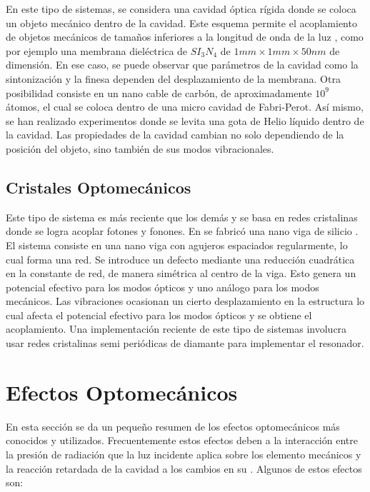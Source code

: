 \documentclass[10pt,a4paper]{report}
\begin{document}
En este tipo de sistemas, se considera una cavidad óptica rígida donde
se coloca un objeto mecánico dentro de la cavidad. Este esquema
permite el acoplamiento de objetos mecánicos de tamaños inferiores a
la longitud de onda de la luz \cite{KippenberCO}, como por ejemplo una
membrana dieléctrica de $SI_3N_4$ de $1mm \times 1mm \times 50nm$ de
dimensión\cite{SankeyMC}. En ese caso, se puede observar que
parámetros de la cavidad como la sintonización y la finesa dependen
del desplazamiento de la membrana. Otra posibilidad consiste en un
nano cable de carbón, de aproximadamente $10^9$ átomos, el cual se
coloca dentro de una micro cavidad de Fabri-Perot. Así mismo, se han
realizado experimentos donde se levita una gota de Helio líquido
dentro de la cavidad\cite{ChildressLD}. Las propiedades de la cavidad
cambian no solo dependiendo de la posición del objeto, sino también de
sus modos vibracionales\cite{FaveroCR}.

\subsection{Cristales Optomecánicos}

Este tipo de sistema es más reciente que los demás y se basa en redes
cristalinas donde se logra acoplar fotones y fonones. En
 se fabricó una nano viga
de silicio \cite{EichenfieldOC}. El sistema consiste en una nano viga
con agujeros espaciados regularmente, lo cual forma una red. Se
introduce un defecto mediante una reducción cuadrática en la constante
de red, de manera simétrica al centro de la viga. Esto genera un
potencial efectivo para los modos ópticos y uno análogo para los modos
mecánicos. Las vibraciones ocasionan un cierto desplazamiento en la
estructura lo cual afecta el potencial efectivo para los modos ópticos
y se obtiene el acoplamiento. Una implementación reciente de este tipo
de sistemas involucra usar redes cristalinas semi periódicas de
diamante para implementar el resonador\cite{BurekDO}.

\section{Efectos Optomecánicos}

En esta sección se da un pequeño resumen de los efectos 
optomecánicos más conocidos y utilizados. Frecuentemente estos efectos
 deben a la interacción entre la presión de radiación que la luz
incidente aplica sobre los elemento mecánicos y la reacción retardada
de la cavidad a los cambios en su .
Algunos de estos efectos son:
\end{document}
